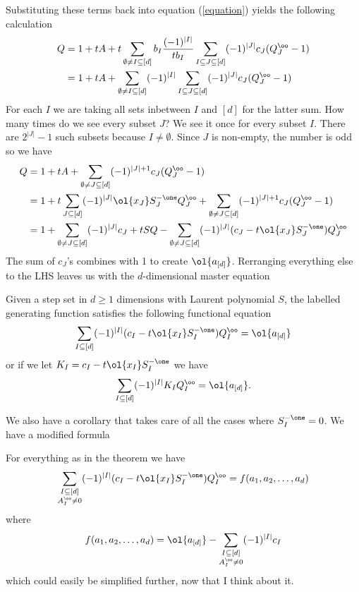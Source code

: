 Substituting these terms back into equation (\ref{equation}) yields the following calculation
\begin{align}
Q & = 1 + tA + t\sum_{\emptyset \neq I \subseteq [d]}b_I \frac{(-1)^{|I|}}{t b_I} \sum_{I\subseteq J \subseteq [d]}(-1)^{|J|} c_J (Q_J^\oo - 1)\\
    &= 1+ tA +\sum_{\emptyset \neq I \subseteq [d]}(-1)^{|I|} \sum_{I\subseteq J \subseteq [d]}(-1)^{|J|} c_J (Q_J^\oo - 1)
\end{align}
For each $I$ we are taking all sets inbetween $I$ and $[d]$ for the latter sum. How many times do we see every subset $J$? We see it once for every subset $I$. There are $2^{|J|} -1 $ such subsets because $I \neq \emptyset$. Since $J$ is non-empty, the number is odd so we have
\begin{align}
Q & = 1 + tA +\sum_{\emptyset \neq J \subseteq [d]}(-1)^{|J|+1} c_J (Q_J^\oo - 1)\\
   & = 1 +  t\sum_{J\subseteq [d]}(-1)^{|J|} \ol{x_J}S_{J}^{-\one}Q_{J}^{\oo} +\sum_{\emptyset \neq J \subseteq [d]}(-1)^{|J|+1} c_J (Q_J^\oo - 1)\\
   & = 1 + \sum_{\emptyset \neq J \subseteq [d]}(-1)^{|J|} c_J + tSQ  - \sum_{\emptyset \neq J \subseteq [d]}(-1)^{|J|}( c_J- t\ol{x_J}S_{J}^{-\one})Q_{J}^{\oo}
\end{align}
The sum of $c_J$'s combines with 1 to create $\ol{a_{[d]}}$. Rerranging everything else to the LHS leaves us with the $d$-dimensional master equation
\begin{theorem} Given a step set in $d\geq 1$ dimensions with Laurent polynomial $S$, the labelled generating function satisfies the following functional equation
\[
    \sum_{I \subseteq [d]}(-1)^{|I|}(c_I-t \ol{x_I}S_{I}^{-\one})Q_I^\oo = \ol{a_{[d]}}
\]
or if we let $K_I = c_I-t \ol{x_I}S_{I}^{-\one}$ we have
\[
   \sum_{I\subseteq [d]}(-1)^{|I|} K_I Q_I^\oo = \ol{a_{[d]}}.
\]
\end{theorem}
We also have a corollary that takes care of all the cases where $S_I^{-\one} = 0$. We have a modified formula
\begin{corollary} For everything as in the theorem we have
\[
     \sum_{\substack{I \subseteq [d]\\A_I^\oo \neq 0}}(-1)^{|I|}(c_I-t \ol{x_I}S_{I}^{-\one})Q_I^\oo = f(a_1,a_2,\ldots,a_d)
\]
where
\[
    f(a_1,a_2,\ldots,a_d) =  \ol{a_{[d]}} - \sum_{\substack{I \subseteq [d]\\A_I^\oo \neq 0}} (-1)^{|I|} c_I
\]
which could easily be simplified further, now that I think about it.
\end{corollary}


